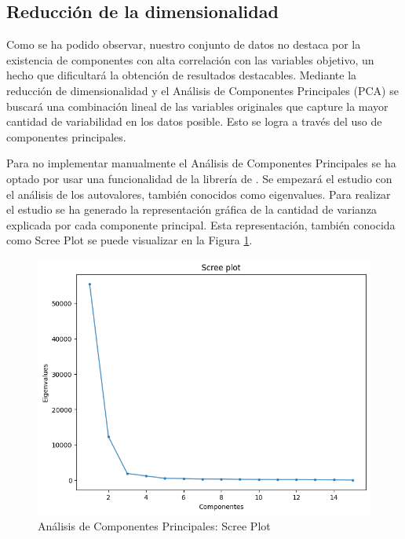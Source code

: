 \subsection{Reducción de la dimensionalidad}

Como se ha podido observar, nuestro conjunto de datos no destaca por la existencia de componentes con alta correlación con las variables objetivo, un hecho que dificultará la obtención de resultados destacables. Mediante la reducción de dimensionalidad y el Análisis de Componentes Principales (PCA) se buscará una combinación lineal de las variables originales que capture la mayor cantidad de variabilidad en los datos posible. Esto se logra a través del uso de componentes principales.

Para no implementar manualmente el Análisis de Componentes Principales se ha optado por usar una funcionalidad de la librería de \cite{Scikit-learn}. Se empezará el estudio con el análisis de los autovalores, también conocidos como eigenvalues. Para realizar el estudio se ha generado la representación gráfica de la cantidad de varianza explicada por cada componente principal. Esta representación, también conocida como Scree Plot se puede visualizar en la Figura \ref{Conjunto-Datos-Scree-Plot}.

\begin{figure}[H]
    \centering
    \includegraphics[width=\figsize]{images/screePlot.png}
    \caption{Análisis de Componentes Principales: Scree Plot}
    \label{Conjunto-Datos-Scree-Plot}
\end{figure}

